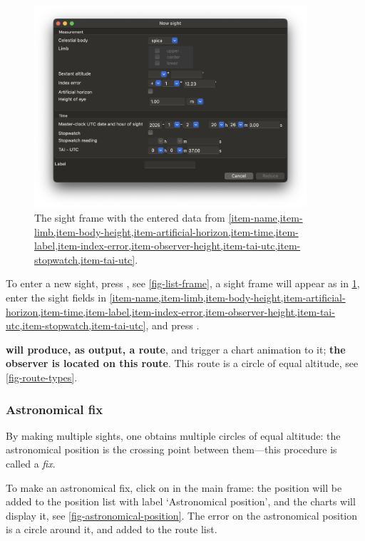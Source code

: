 \documentclass{ol-softwaremanual}
\begin{document}
  \begin{figure}
    \centering
    \includegraphics[width=0.9\textwidth]{figures/sight-frame.png}
    \caption{
      \label{fig-sight-frame}
      The sight frame with the entered data from \cref{item-name,item-limb,item-body-height,item-artificial-horizon,item-time,item-label,item-index-error,item-observer-height,item-tai-utc,item-stopwatch,item-tai-utc}. 
    }
  \end{figure}
  

To enter a new sight, press  , see \cref{fig-list-frame}, a sight frame will appear as in \cref{fig-sight-frame}, enter the sight fields in  \cref{item-name,item-limb,item-body-height,item-artificial-horizon,item-time,item-label,item-index-error,item-observer-height,item-tai-utc,item-stopwatch,item-tai-utc}, and press . 

\textbf{\thel will produce, as output, a route}, and trigger a chart animation to it; \textbf{the observer is located  on this route}. This route is a circle of equal altitude, see \cref{fig-route-types}. 

\subsubsection{Astronomical fix}

By making multiple sights, one obtains multiple circles of equal altitude: the astronomical position is the crossing point between them---this procedure is called a \textit{fix}. 

To make an astronomical fix, click on  in the main frame: the position will be added to the position list with label `Astronomical position', and the charts will display it, see \cref{fig-astronomical-position}. The error on the astronomical position is a circle around it, and added to the route list. 
\end{document}
